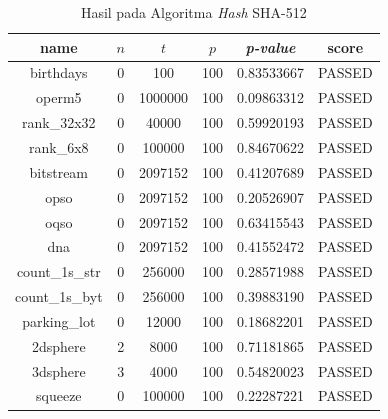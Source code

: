 \documentclass[conference]{IEEEtran}
\newcommand{\en}[1]
    {\foreignlanguage{english}{\textit{#1}}}
\begin{document}
\begin{table}[htbp]
    \caption{Hasil  pada Algoritma \en{Hash} SHA-512}
    \label{tab:analisis:res-sha512}
    \begin{center}
        \begin{tabular}{|c|c|c|c|c|c|}
            \hline
            \textbf{name}  & \textbf{$n$} & \textbf{$t$} & \textbf{$p$} & \textbf{\en{p-value}} & \textbf{score} \\
            \hline
            birthdays      & 0            & 100          & 100          & 0.83533667            & PASSED         \\
            operm5         & 0            & 1000000      & 100          & 0.09863312            & PASSED         \\
            rank\_32x32    & 0            & 40000        & 100          & 0.59920193            & PASSED         \\
            rank\_6x8      & 0            & 100000       & 100          & 0.84670622            & PASSED         \\
            bitstream      & 0            & 2097152      & 100          & 0.41207689            & PASSED         \\
            opso           & 0            & 2097152      & 100          & 0.20526907            & PASSED         \\
            oqso           & 0            & 2097152      & 100          & 0.63415543            & PASSED         \\
            dna            & 0            & 2097152      & 100          & 0.41552472            & PASSED         \\
            count\_1s\_str & 0            & 256000       & 100          & 0.28571988            & PASSED         \\
            count\_1s\_byt & 0            & 256000       & 100          & 0.39883190            & PASSED         \\
            parking\_lot   & 0            & 12000        & 100          & 0.18682201            & PASSED         \\
            2dsphere       & 2            & 8000         & 100          & 0.71181865            & PASSED         \\
            3dsphere       & 3            & 4000         & 100          & 0.54820023            & PASSED         \\
            squeeze        & 0            & 100000       & 100          & 0.22287221            & PASSED         \\

\end{tabular}
\end{center}
\end{table}
\end{document}
